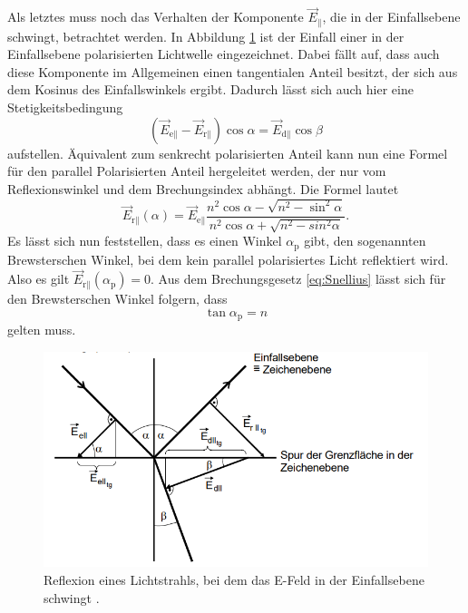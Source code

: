 \noindent Als letztes muss noch das Verhalten der Komponente $\vec{E}_\parallel$, die in der Einfallsebene schwingt, betrachtet werden.
In Abbildung \ref{fig:RefanG} ist der Einfall einer in der Einfallsebene polarisierten Lichtwelle eingezeichnet.
Dabei fällt auf, dass auch diese Komponente im Allgemeinen einen tangentialen Anteil besitzt, der sich aus dem Kosinus
des Einfallswinkels ergibt. Dadurch lässt sich auch hier eine Stetigkeitsbedingung
\begin{equation}
    \left(\vec{E}_{\text{e}\parallel}- \vec{E}_{\text{r}\parallel}\right)\cos{\alpha}= \vec{E}_{\text{d}\parallel}\cos{\beta}
    \label{Stetpara}
\end{equation}
aufstellen. Äquivalent zum senkrecht polarisierten Anteil kann nun eine Formel für
den parallel Polarisierten Anteil hergeleitet werden, der nur vom Reflexionswinkel und dem Brechungsindex abhängt.
Die Formel lautet
\begin{equation}
    \vec{E}_{\text{r}\parallel}(\alpha)=\vec{E}_{\text{e}\parallel}\frac{n^2\cos{\alpha}-\sqrt{n^2-\sin^2{\alpha}}}{n^2\cos{\alpha}+\sqrt{n^2-sin^2{\alpha}}}.
    \label{eq:Epara}
\end{equation}
Es lässt sich nun feststellen, dass es einen Winkel $\alpha_\text{p}$ gibt, den sogenannten Brewsterschen Winkel, bei dem kein parallel polarisiertes Licht
reflektiert wird. Also es gilt $\vec{E}_{\text{r}\parallel}(\alpha_\text{p})=0$. Aus dem Brechungsgesetz \eqref{eq:Snellius} lässt sich für den Brewsterschen Winkel folgern, dass
\begin{equation}
    \tan{\alpha_\text{p}}=n
    \label{eq:Brewster}
\end{equation}
gelten muss.\cite{sample}
\begin{figure}[H]
    \centering
    \includegraphics[scale=1]{content/Reflexion.png}
    \caption{Reflexion eines Lichtstrahls, bei dem das E-Feld in der Einfallsebene schwingt \cite{sample}.}
    \label{fig:RefanG}
\end{figure}


